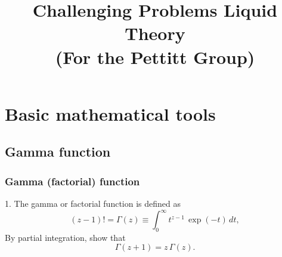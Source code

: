 \documentclass{book}
\begin{document}
\newcommand{\problem}[1]{\subsection{#1}}
\newcommand{\hint}[1]{[\,\emph{Hint.} #1]}

\newcommand{\vct}[1]{\boldsymbol{\mathbf{#1}}}
\newcommand{\vr}{\vct{r}}
\newcommand{\vrN}{\vr^N}
\newcommand{\vrn}{\vr^n}
\newcommand{\dvr}{\frac{ d \vr  }{(2\pi)^3}}
\newcommand{\vx}{\vct{x}}
\newcommand{\vxN}{\vx^N}
\newcommand{\vxn}{\vx^n}
\newcommand{\dvx}{\frac{ d \vx  }{(2\pi)^3}}
\newcommand{\vk}{\vct{k}}
\newcommand{\dvk}{\frac{ d \vk  }{(2\pi)^3}}
\newcommand{\FT}[1]{\tilde{#1}}
\newcommand{\FTc}{\FT{c}}
\newcommand{\FTh}{\FT{h}}

\newcommand{\supex}[1]{ { { #1 }^{ \mathrm{ex} } } }
\newcommand{\Pex}{\supex{P}}
\newcommand{\Fex}{\supex{F}}
\newcommand{\muex}{\supex{\mu}}
\newcommand{\kex}{\supex{\kappa}}
\newcommand{\Chn}{\mathscr{C}}
\newcommand{\secref}[1]{Sec. \ref{#1}}

\newcommand{\llbra}{[\![}
\newcommand{\llket}{]\!]}

\newcommand{\plam}{\partial_\lambda}
\newcommand{\pbet}{\partial_\beta}



\title{Challenging Problems Liquid Theory \\
  (For the Pettitt Group)}
\date{}
\maketitle

\tableofcontents





\chapter{Basic mathematical tools}



\section{Gamma function}



\problem{Gamma (factorial) function}



1. The gamma or factorial function is defined as
\begin{equation}
  (z - 1)! = \Gamma(z)
\equiv
  \int_0^\infty t^{z-1} \, \exp(-t) \, d t,
  \label{eq:gammaDef}
\end{equation}
%
By partial integration, show that
\begin{equation}
  \Gamma(z + 1) = z \, \Gamma(z).
  \label{eq:gammaRecur}
\end{equation}
\end{document}
